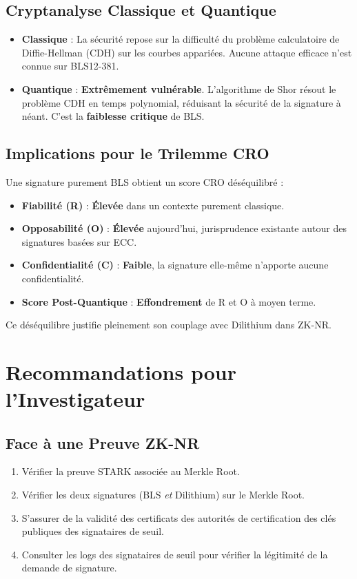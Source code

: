 \subsection{Cryptanalyse Classique et Quantique}
\label{subsec:19.2.2}
\begin{itemize}
    \item \textbf{Classique} : La sécurité repose sur la difficulté du problème calculatoire de Diffie-Hellman (CDH) sur les courbes appariées. Aucune attaque efficace n'est connue sur BLS12-381.
    \item \textbf{Quantique} : \textbf{Extrêmement vulnérable}. L'algorithme de Shor résout le problème CDH en temps polynomial, réduisant la sécurité de la signature à néant. C'est la \textbf{faiblesse critique} de BLS.
\end{itemize}

\subsection{Implications pour le Trilemme CRO}
\label{subsec:19.2.3}
Une signature purement BLS obtient un score CRO déséquilibré :
\begin{itemize}
    \item \textbf{Fiabilité (R)} : \textbf{Élevée} dans un contexte purement classique.
    \item \textbf{Opposabilité (O)} : \textbf{Élevée} aujourd'hui, jurisprudence existante autour des signatures basées sur ECC.
    \item \textbf{Confidentialité (C)} : \textbf{Faible}, la signature elle-même n'apporte aucune confidentialité.
    \item \textbf{Score Post-Quantique} : \textbf{Effondrement} de R et O à moyen terme.
\end{itemize}
Ce déséquilibre justifie pleinement son couplage avec Dilithium dans ZK-NR.

\section{Recommandations pour l'Investigateur}
\label{sec:19.3}

\subsection{Face à une Preuve ZK-NR}
\label{subsec:19.3.1}
\begin{enumerate}
    \item Vérifier la preuve STARK associée au Merkle Root.
    \item Vérifier les deux signatures (BLS \textit{et} Dilithium) sur le Merkle Root.
    \item S'assurer de la validité des certificats des autorités de certification des clés publiques des signataires de seuil.
    \item Consulter les logs des signataires de seuil pour vérifier la légitimité de la demande de signature.
\end{enumerate}

